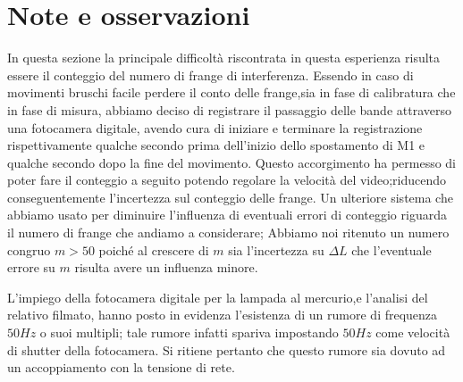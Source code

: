 \section{Note e osservazioni}
In questa sezione la principale difficoltà
riscontrata in questa esperienza risulta essere il conteggio del
numero di frange di interferenza.
Essendo in caso di movimenti bruschi facile
perdere il conto delle frange,sia in fase di 
calibratura che in fase di misura, abbiamo deciso di registrare 
il passaggio delle bande attraverso una fotocamera digitale,
avendo cura di iniziare e terminare la registrazione rispettivamente qualche 
secondo prima dell'inizio dello spostamento di M1
e qualche secondo dopo la fine del movimento.
Questo accorgimento ha permesso di poter fare il conteggio a seguito
potendo regolare la velocità del video;riducendo conseguentemente l'incertezza 
sul conteggio delle frange.
Un ulteriore sistema che abbiamo usato per diminuire l'influenza 
di eventuali errori di conteggio riguarda il numero di frange che andiamo a 
considerare;
Abbiamo noi ritenuto un numero congruo $m> 50$
poiché al crescere di $m$ sia l'incertezza su $\Delta L$ che l'eventuale 
errore su $m$ risulta avere un influenza minore.

L'impiego della fotocamera digitale per la lampada al mercurio,e l'analisi del
relativo filmato, 
hanno posto in evidenza l'esistenza di un rumore di frequenza $50 Hz$ o 
suoi multipli; tale rumore infatti spariva impostando $50 Hz$ come velocità di shutter della fotocamera.
Si ritiene pertanto che questo rumore sia dovuto  ad un accoppiamento con 
la tensione di rete.